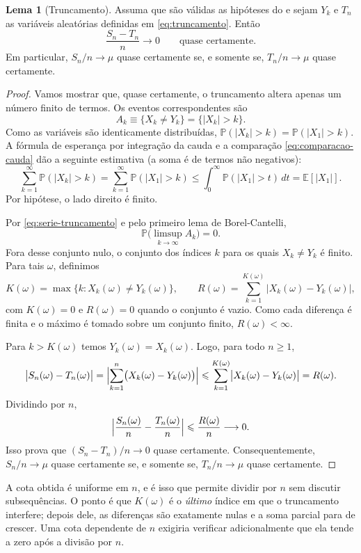 \documentclass[12pt,portuguese]{article}
\theoremstyle{definition}
\newtheorem{lemma}[lemma]{Lema}
\theoremstyle{plainexercise}
\theoremstyle{starredexercise}
\theoremstyle{definition}
\begin{document}
\begin{lemma}[Truncamento]\label{lem:truncamento}
Assuma que são válidas as hipóteses do  e sejam $Y_k$ e $T_n$ as variáveis aleatórias
definidas em \eqref{eq:truncamento}. Então
\[
\frac{S_n-T_n}{n}\longrightarrow0
\qquad\text{quase certamente.}
\]
Em particular, $S_n/n\to\mu$ quase certamente se, e somente se,
$T_n/n\to\mu$ quase certamente.
\end{lemma}

\begin{proof}
Vamos mostrar que, quase certamente, o truncamento altera apenas um número
finito de termos. Os eventos correspondentes são
\[
A_k\equiv\{X_k\neq Y_k\}=\{|X_k|>k\}.
\]
Como as variáveis são identicamente distribuídas,
$\mathbb{P}(|X_k|>k)=\mathbb{P}(|X_1|>k)$. A fórmula de esperança por integração
da cauda e a comparação \eqref{eq:comparacao-cauda} dão a seguinte estimativa
(a soma é de termos não negativos):
\begin{equation}\label{eq:serie-truncamento}
\sum_{k=1}^{\infty}\mathbb{P}(|X_k|>k)
=
\sum_{k=1}^{\infty}\mathbb{P}(|X_1|>k)
\leqslant
\int_0^{\infty}\mathbb{P}(|X_1|>t)\,dt
=
\mathbb{E}[|X_1|].
\end{equation}
Por hipótese, o lado direito é finito.

Por \eqref{eq:serie-truncamento} e pelo primeiro lema de Borel-Cantelli,
\[
\mathbb{P}\bigl(\limsup_{k\to\infty}A_k\bigr)=0.
\]
Fora desse conjunto nulo, o conjunto dos índices $k$ para os quais
$X_k\neq Y_k$ é finito. Para tais $\omega$, definimos
\[
K(\omega)=\max\{k:X_k(\omega)\neq Y_k(\omega)\},
\qquad
R(\omega)=\sum_{k=1}^{K(\omega)}\bigl|X_k(\omega)-Y_k(\omega)\bigr|,
\]
com $K(\omega)=0$ e $R(\omega)=0$ quando o conjunto é vazio. Como cada
diferença é finita e o máximo é tomado sobre um conjunto finito,
$R(\omega)<\infty$.

Para $k>K(\omega)$ temos $Y_k(\omega)=X_k(\omega)$. Logo, para todo
$n\geqslant1$,
\[
\bigl|S_n(\omega)-T_n(\omega)\bigr|
=
\Bigl|\sum_{k=1}^{n}\bigl(X_k(\omega)-Y_k(\omega)\bigr)\Bigr|
\leqslant
\sum_{k=1}^{K(\omega)}\bigl|X_k(\omega)-Y_k(\omega)\bigr|
=
R(\omega).
\]
Dividindo por $n$,
\[
\Bigl|\frac{S_n(\omega)}{n}-\frac{T_n(\omega)}{n}\Bigr|
\leqslant
\frac{R(\omega)}{n}\longrightarrow0.
\]
Isso prova que $(S_n-T_n)/n\to0$ quase certamente. Consequentemente,
$S_n/n\to\mu$ quase certamente se, e somente se, $T_n/n\to\mu$ quase
certamente.
\end{proof}

A cota obtida é uniforme em $n$, e é isso que permite dividir por $n$ sem
discutir subsequências. O ponto é que $K(\omega)$ é o \emph{último} índice em
que o truncamento interfere; depois dele, as diferenças são exatamente nulas e
a soma parcial para de crescer. Uma cota dependente de $n$ exigiria verificar
adicionalmente que ela tende a zero após a divisão por $n$.
\end{document}
